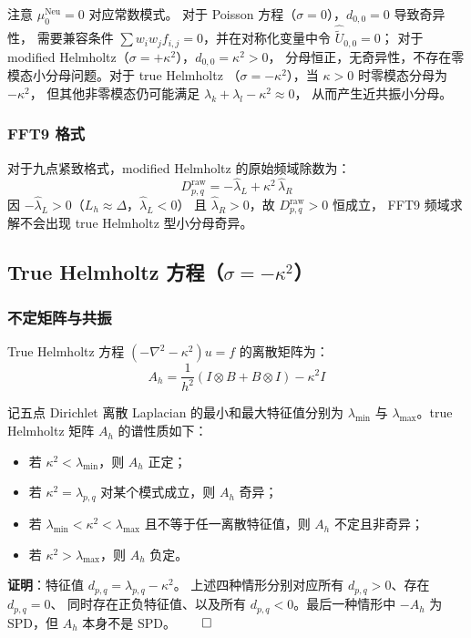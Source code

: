 注意 $\mu_0^{\mathrm{Neu}} = 0$ 对应常数模式。
对于 Poisson 方程（$\sigma=0$），$d_{0,0}=0$ 导致奇异性，
需要兼容条件 $\sum w_iw_jf_{i,j}=0$，并在对称化变量中令
$\widehat{\tilde U}_{0,0}=0$；
对于 modified Helmholtz（$\sigma=+\kappa^2$），$d_{0,0}=\kappa^2 > 0$，
分母恒正，无奇异性，不存在零模态小分母问题。对于 true Helmholtz
（$\sigma=-\kappa^2$），当 $\kappa>0$ 时零模态分母为 $-\kappa^2$，
但其他非零模态仍可能满足 $\lambda_k+\lambda_l-\kappa^2\approx0$，
从而产生近共振小分母。

\subsubsection{FFT9 格式}

对于九点紧致格式，modified Helmholtz 的原始频域除数为：
\begin{equation}
  D_{p,q}^{\mathrm{raw}} = -\hat{\lambda}_L + \kappa^2\,\hat{\lambda}_R
\end{equation}
因 $-\hat{\lambda}_L > 0$（$L_h \approx \Delta$，$\hat{\lambda}_L < 0$）
且 $\hat{\lambda}_R > 0$，故 $D_{p,q}^{\mathrm{raw}} > 0$ 恒成立，
FFT9 频域求解不会出现 true Helmholtz 型小分母奇异。

\subsection{True Helmholtz 方程（$\sigma = -\kappa^2$）}

\subsubsection{不定矩阵与共振}

True Helmholtz 方程 $(-\nabla^2-\kappa^2)u=f$ 的离散矩阵为：
\begin{equation}
  A_h = \frac{1}{h^2}(I \otimes B + B \otimes I) - \kappa^2 I
  \label{eq:true_matrix}
\end{equation}

\begin{theorem}
  \label{thm:true_indefinite}
  记五点 Dirichlet 离散 Laplacian 的最小和最大特征值分别为
  $\lambda_{\min}$ 与 $\lambda_{\max}$。true Helmholtz 矩阵 $A_h$ 的谱性质如下：
  \begin{itemize}[itemsep=1pt]
    \item 若 $\kappa^2 < \lambda_{\min}$，则 $A_h$ 正定；
    \item 若 $\kappa^2 = \lambda_{p,q}$ 对某个模式成立，则 $A_h$ 奇异；
    \item 若 $\lambda_{\min}<\kappa^2<\lambda_{\max}$ 且不等于任一离散特征值，则 $A_h$ 不定且非奇异；
    \item 若 $\kappa^2>\lambda_{\max}$，则 $A_h$ 负定。
  \end{itemize}

  \textbf{证明}：特征值 $d_{p,q} = \lambda_{p,q}-\kappa^2$。
  上述四种情形分别对应所有 $d_{p,q}>0$、存在 $d_{p,q}=0$、
  同时存在正负特征值、以及所有 $d_{p,q}<0$。最后一种情形中
  $-A_h$ 为 SPD，但 $A_h$ 本身不是 SPD。$\qed$
\end{theorem}

